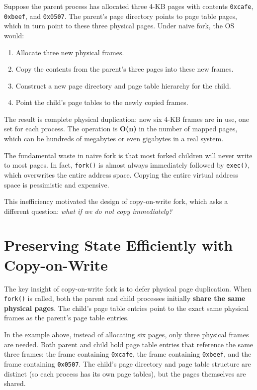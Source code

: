 \documentclass[11pt]{article}
\begin{document}
Suppose the parent process has allocated three 4-KB pages with contents \texttt{0xcafe}, \texttt{0xbeef}, and \texttt{0x0507}. The parent's page directory points to page table pages, which in turn point to these three physical pages. Under naive fork, the OS would:

\begin{enumerate}
    \item Allocate three new physical frames.
    \item Copy the contents from the parent's three pages into these new frames.
    \item Construct a new page directory and page table hierarchy for the child.
    \item Point the child's page tables to the newly copied frames.
\end{enumerate}

The result is complete physical duplication: now six 4-KB frames are in use, one set for each process. The operation is \textbf{O(n)} in the number of mapped pages, which can be hundreds of megabytes or even gigabytes in a real system.

\begin{keyidea}
The fundamental waste in naive fork is that most forked children will never write to most pages. In fact, \texttt{fork()} is almost always immediately followed by \texttt{exec()}, which overwrites the entire address space. Copying the entire virtual address space is pessimistic and expensive.
\end{keyidea}

This inefficiency motivated the design of copy-on-write fork, which asks a different question: \emph{what if we do not copy immediately?}

\section{Preserving State Efficiently with Copy-on-Write}

The key insight of copy-on-write fork is to defer physical page duplication. When \texttt{fork()} is called, both the parent and child processes initially \textbf{share the same physical pages}. The child's page table entries point to the exact same physical frames as the parent's page table entries.

In the example above, instead of allocating six pages, only three physical frames are needed. Both parent and child hold page table entries that reference the same three frames: the frame containing \texttt{0xcafe}, the frame containing \texttt{0xbeef}, and the frame containing \texttt{0x0507}. The child's page directory and page table structure are distinct (so each process has its own page tables), but the pages themselves are shared.
\end{document}
